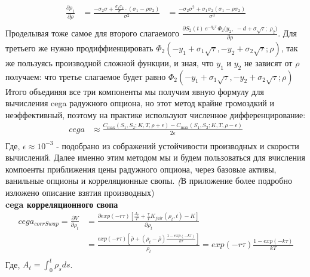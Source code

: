 \begin{equation}
\begin{aligned}
\frac{\partial \rho_1}{\partial \rho} &= \frac{-\sigma_2 \sigma +
 \frac{\sigma_1 \sigma_2}{\sigma} \cdot (\sigma_1 - \rho \sigma_2)}{\sigma^2} &= \frac{-\sigma_2 \sigma^2 + \sigma_1 \sigma_2 (\sigma_1 - \rho \sigma_2)}{\sigma^3} \\
\end{aligned}
\end{equation}
Проделывая тоже самое для второго слагаемого $\frac{\partial S_2(t)\,e^{-q_2\tau}\,\Phi_2\!\bigl(y_2,\;-d + \sigma \sqrt{\tau};\;\rho_2\bigr) }{\partial \rho}$.
 Для третьего же нужно продиффиенцировать 
 $\Phi_2(-y_1 + \sigma_1 \sqrt{\tau}, -y_2 + \sigma_2 \sqrt{\tau}; \rho)$, 
 так же пользуясь производной сложной функции, и зная, что $y_1$ и $y_2$ не зависят от $\rho$ получаем:
что третье слагаемое будет равно $\Phi_2(-y_1 + \sigma_1 \sqrt{\tau}, -y_2 + \sigma_2 \sqrt{\tau}; \rho)$
Итого объединяя все три компоненты мы получим явную формулу для вычисления cega радужного опциона, но 
этот метод крайне громоздкий и неэффективный, поэтому на практике используют численное дифференцирование:
\begin{equation}
\begin{aligned}
cega &\approx \frac{C_{\max}(S_{1}, S_{2}; K, T, \rho + \epsilon) - C_{\max}(S_{1}, S_{2}; K, T, \rho - \epsilon)}{2\epsilon} \\
\end{aligned}
\end{equation}
Где, $\epsilon \approx 10^{-3}$ - подобрано из сображений устойчивости производных и скорости вычислений. 
Далее именно этим методом мы и будем пользоваться для вчисления компоенты 
приближения цены радужного опциона, через базовые активы, ванильные опционы и корреляционные свопы.
\textit(В приложение более подробно изложено описание взятия производных) \\ 
\textbf{cega корреляционного свопа} \\
\begin{equation}
\begin{aligned}
cega_{corrSwap} = \frac{\partial V}{\partial \rho_t} &= \frac{\partial exp(-r \tau) [\frac{A_t}{T} + \frac{\tau}{T} K_{fair}(\rho_t, t)-K]}{\partial \rho_t} \\
&= \frac{exp(-r \tau) [\bar{\rho} + (\rho_t - \bar{\rho}) \frac{1 - exp(-k\tau)}{k\tau}]}{\rho_t} = exp(-r\tau)\frac{1-exp(-k\tau)}{kT} \\
\end{aligned}
\end{equation} 
Где, $A_t = \int_{0}^{t}\rho_s ds$.



